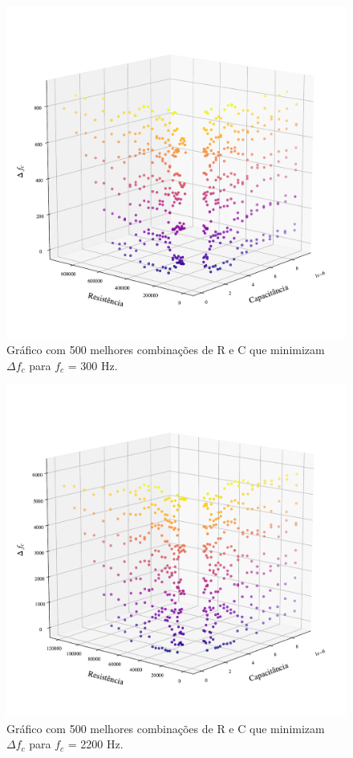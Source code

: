 \documentclass{article}
\begin{document}
\pagebreak

\begin{figure}[ht!]
  \centering
  \includegraphics[width=.77\textwidth,trim={7mm 18mm 15mm 34mm},clip]{fig/low.pdf}
  \caption{Gráfico com 500 melhores combinações de R e C que minimizam $\Delta f_c$ para $f_c$ = 300 Hz.}
  \label{fig:plot-passa-baixa}
\end{figure}

\begin{figure}[ht!]
  \centering
  \includegraphics[width=.77\textwidth,trim={7mm 18mm 15mm 34mm},clip]{fig/high.pdf}
  \caption{Gráfico com 500 melhores combinações de R e C que minimizam $\Delta f_c$ para $f_c$ = 2200 Hz.}
  \label{fig:plot-passa-alta}
\end{figure}
\end{document}
